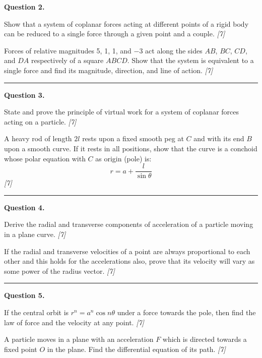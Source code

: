 \documentclass[11pt,a4paper]{article}
\newcommand{\pts}[1]{\hfill   \textit{[#1]}}
\begin{document}
\noindent   \textbf{Question 2.}

\begin{parts}
  \item Show that a system of coplanar forces acting at different points of a rigid body can be reduced to a single force through a given point and a couple. \pts{7}
  \item Forces of relative magnitudes 5, 1, 1, and $-3$ act along the sides $AB$, $BC$, $CD$, and $DA$ respectively of a square $ABCD$. Show that the system is equivalent to a single force and find its magnitude, direction, and line of action. \pts{7}
\end{parts}

\medskip\rule{\linewidth}{0.2pt}

\medskip


\noindent   \textbf{Question 3.}

\begin{parts}
  \item State and prove the principle of virtual work for a system of coplanar forces acting on a particle. \pts{7}
  \item A heavy rod of length $2l$ rests upon a fixed smooth peg at $C$ and with its end $B$ upon a smooth curve. If it rests in all positions, show that the curve is a conchoid whose polar equation with $C$ as origin (pole) is:
  \[
  r = a + \frac{l}{\sin \theta}
  \] \pts{7}
\end{parts}

\medskip\rule{\linewidth}{0.2pt}

\medskip


\noindent   \textbf{Question 4.}

\begin{parts}
  \item Derive the radial and transverse components of acceleration of a particle moving in a plane curve. \pts{7}
  \item If the radial and transverse velocities of a point are always proportional to each other and this holds for the accelerations also, prove that its velocity will vary as some power of the radius vector. \pts{7}
\end{parts}

\medskip\rule{\linewidth}{0.2pt}

\medskip


\noindent   \textbf{Question 5.}

\begin{parts}
  \item If the central orbit is $r^n = a^n \cos n \theta$ under a force towards the pole, then find the law of force and the velocity at any point. \pts{7}
  \item A particle moves in a plane with an acceleration $F$ which is directed towards a fixed point $O$ in the plane. Find the differential equation of its path. \pts{7}
\end{parts}
\end{document}
